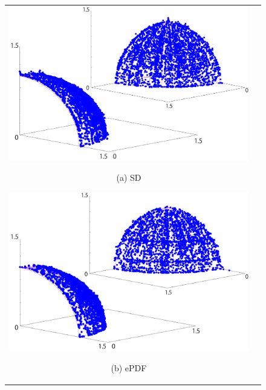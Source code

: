 \documentclass[../main/main]{subfiles}
\begin{document}
\begin{figure}[htbp]
\begin{tabular}{cc}
\begin{minipage}{0.33\hsize}
\includegraphics[width=1\linewidth]{../figures/multidtlz4_sd_double.pdf}
\begin{center}
{\footnotesize (a) SD}
\end{center}
\end{minipage}
\begin{minipage}{0.33\hsize}
\includegraphics[width=1\linewidth]{../figures/multidtlz4_kde_double.pdf}
\begin{center}
{\footnotesize (b) ePDF}
\end{center}
\end{minipage}
\begin{minipage}{0.33\hsize}

\end{minipage}
\end{tabular}
\end{figure}
\end{document}
